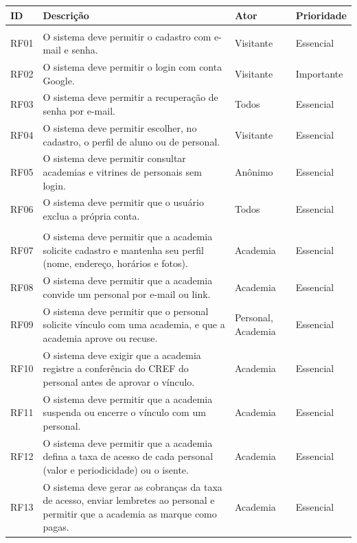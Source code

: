 \begin{longtable}{@{}>{\raggedright\arraybackslash}p{1.2cm} >{\raggedright\arraybackslash}p{7.6cm} >{\raggedright\arraybackslash}p{2.7cm} >{\raggedright\arraybackslash}p{2.4cm}@{}}
  \toprule
  \textbf{ID} & \textbf{Descrição} & \textbf{Ator} & \textbf{Prioridade} \\
  \midrule
  \endhead
  \bottomrule
  \endfoot
  \multicolumn{4}{@{}l}{\textbf{Contas e acesso}} \\
  RF01 & O sistema deve permitir o cadastro com e-mail e senha. & Visitante & Essencial \\
  RF02 & O sistema deve permitir o login com conta Google. & Visitante & Importante \\
  RF03 & O sistema deve permitir a recuperação de senha por e-mail. & Todos & Essencial \\
  RF04 & O sistema deve permitir escolher, no cadastro, o perfil de aluno ou de personal. & Visitante & Essencial \\
  RF05 & O sistema deve permitir consultar academias e vitrines de personais sem login. & Anônimo & Essencial \\
  RF06 & O sistema deve permitir que o usuário exclua a própria conta. & Todos & Essencial \\
  \addlinespace
  \multicolumn{4}{@{}l}{\textbf{Academia}} \\
  RF07 & O sistema deve permitir que a academia solicite cadastro e mantenha seu perfil (nome, endereço, horários e fotos). & Academia & Essencial \\
  RF08 & O sistema deve permitir que a academia convide um personal por e-mail ou link. & Academia & Essencial \\
  RF09 & O sistema deve permitir que o personal solicite vínculo com uma academia, e que a academia aprove ou recuse. & Personal, Academia & Essencial \\
  RF10 & O sistema deve exigir que a academia registre a conferência do CREF do personal antes de aprovar o vínculo. & Academia & Essencial \\
  RF11 & O sistema deve permitir que a academia suspenda ou encerre o vínculo com um personal. & Academia & Essencial \\
  RF12 & O sistema deve permitir que a academia defina a taxa de acesso de cada personal (valor e periodicidade) ou o isente. & Academia & Essencial \\
  RF13 & O sistema deve gerar as cobranças da taxa de acesso, enviar lembretes ao personal e permitir que a academia as marque como pagas. & Academia & Essencial \\

\end{longtable}
